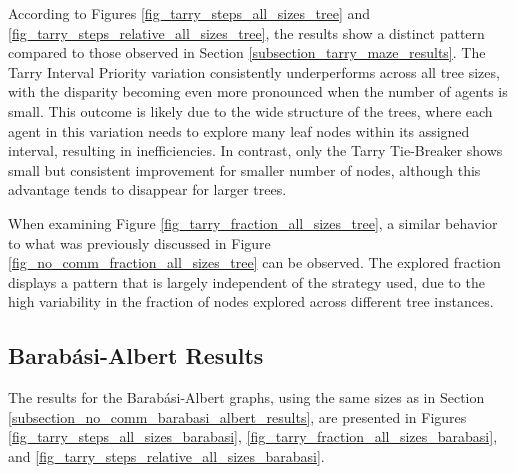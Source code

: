 According to Figures \ref{fig_tarry_steps_all_sizes_tree} and \ref{fig_tarry_steps_relative_all_sizes_tree}, the results show a distinct pattern compared to those observed in Section \ref{subsection_tarry_maze_results}. The Tarry Interval Priority variation consistently underperforms across all tree sizes, with the disparity becoming even more pronounced when the number of agents is small. This outcome is likely due to the wide structure of the trees, where each agent in this variation needs to explore many leaf nodes within its assigned interval, resulting in inefficiencies. In contrast, only the Tarry Tie-Breaker shows small but consistent improvement for smaller number of nodes, although this advantage tends to disappear for larger trees.


When examining Figure \ref{fig_tarry_fraction_all_sizes_tree}, a similar behavior to what was previously discussed in Figure \ref{fig_no_comm_fraction_all_sizes_tree} can be observed. The explored fraction displays a pattern that is largely independent of the strategy used, due to the high variability in the fraction of nodes explored across different tree instances.

\subsection{Barabási-Albert Results} 
\label{subsection_tarry_barabasi_albert_results}

The results for the Barabási-Albert graphs, using the same sizes as in Section \ref{subsection_no_comm_barabasi_albert_results}, are presented in Figures \ref{fig_tarry_steps_all_sizes_barabasi}, \ref{fig_tarry_fraction_all_sizes_barabasi}, and \ref{fig_tarry_steps_relative_all_sizes_barabasi}.


